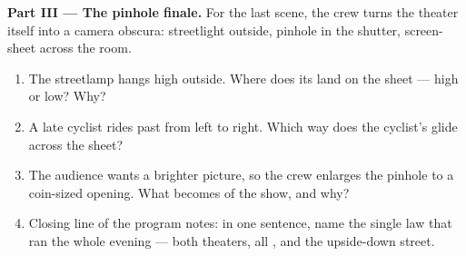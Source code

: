 \begin{problem}
\medskip\noindent\textbf{Part III --- The pinhole finale.}
For the last scene, the crew turns the theater itself into a
camera obscura: streetlight outside, pinhole in the shutter,
screen-sheet across the room.
\begin{enumerate}[resume]
  \item The streetlamp hangs high outside. Where does its 
        land on the sheet --- high or low? Why?
  \item A late cyclist rides past from left to right. Which way
        does the cyclist's  glide across the sheet?
  \item The audience wants a brighter picture, so the crew
        enlarges the pinhole to a coin-sized opening. What
        becomes of the show, and why?
  \item Closing line of the program notes: in one sentence,
        name the single law that ran the whole evening --- both
        theaters, all , and the upside-down street.
\end{enumerate}
\end{problem}
